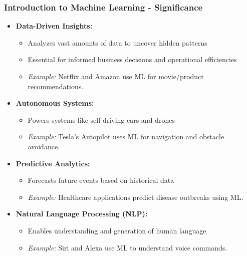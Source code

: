 \documentclass[aspectratio=169]{beamer}
\begin{document}
\begin{frame}[fragile]
    \frametitle{Introduction to Machine Learning - Significance}
    
    \begin{itemize}
        \item \textbf{Data-Driven Insights:}
        \begin{itemize}
            \item Analyzes vast amounts of data to uncover hidden patterns
            \item Essential for informed business decisions and operational efficiencies
            \item \textit{Example:} Netflix and Amazon use ML for movie/product recommendations.
        \end{itemize}
        
        \item \textbf{Autonomous Systems:}
        \begin{itemize}
            \item Powers systems like self-driving cars and drones
            \item \textit{Example:} Tesla's Autopilot uses ML for navigation and obstacle avoidance.
        \end{itemize}

        \item \textbf{Predictive Analytics:}
        \begin{itemize}
            \item Forecasts future events based on historical data
            \item \textit{Example:} Healthcare applications predict disease outbreaks using ML.
        \end{itemize}

        \item \textbf{Natural Language Processing (NLP):}
        \begin{itemize}
            \item Enables understanding and generation of human language
            \item \textit{Example:} Siri and Alexa use ML to understand voice commands.
        \end{itemize}
    \end{itemize}
\end{frame}
\end{document}

